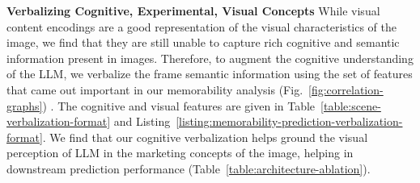 \textbf{Verbalizing Cognitive, Experimental, Visual Concepts}
\label{sec:Verbalizing Visual Content}
While visual content encodings are a good representation of the visual characteristics of the image, we find that they are still unable to capture rich cognitive and semantic information present in images. Therefore, to augment the cognitive understanding of the LLM, we verbalize the frame semantic information using the set of features that came out important in our memorability analysis (Fig.~\ref{fig:correlation-graphs}) \cite{bhattacharya2023video,singh2024llava}. The cognitive and visual features are given in Table~\ref{table:scene-verbalization-format} and Listing~\ref{listing:memorability-prediction-verbalization-format}. We find that our cognitive verbalization helps ground the visual perception of LLM in the marketing concepts of the image, helping in downstream prediction performance (Table~\ref{table:architecture-ablation}). %






